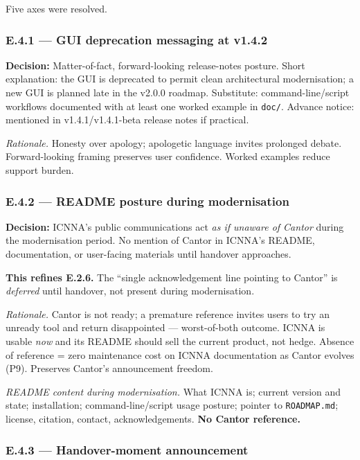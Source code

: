 \documentclass[11pt,a4paper]{article}
\begin{document}
Five axes were resolved.

\subsubsection{E.4.1 --- GUI deprecation messaging at v1.4.2}

\textbf{Decision:} Matter-of-fact, forward-looking release-notes posture. Short explanation: the GUI is deprecated to permit clean architectural modernisation; a new GUI is planned late in the v2.0.0 roadmap. Substitute: command-line/script workflows documented with at least one worked example in \texttt{doc/}. Advance notice: mentioned in v1.4.1/v1.4.1-beta release notes if practical.

\textit{Rationale.} Honesty over apology; apologetic language invites prolonged debate. Forward-looking framing preserves user confidence. Worked examples reduce support burden.

\subsubsection{E.4.2 --- README posture during modernisation}

\textbf{Decision:} ICNNA's public communications act \emph{as if unaware of Cantor} during the modernisation period. No mention of Cantor in ICNNA's README, documentation, or user-facing materials until handover approaches.

\textbf{This refines E.2.6.} The ``single acknowledgement line pointing to Cantor'' is \emph{deferred} until handover, not present during modernisation.

\textit{Rationale.} Cantor is not ready; a premature reference invites users to try an unready tool and return disappointed --- worst-of-both outcome. ICNNA is usable \emph{now} and its README should sell the current product, not hedge. Absence of reference = zero maintenance cost on ICNNA documentation as Cantor evolves (P9). Preserves Cantor's announcement freedom.

\textit{README content during modernisation.} What ICNNA is; current version and state; installation; command-line/script usage posture; pointer to \texttt{ROADMAP.md}; license, citation, contact, acknowledgements. \textbf{No Cantor reference.}

\subsubsection{E.4.3 --- Handover-moment announcement}
\end{document}
